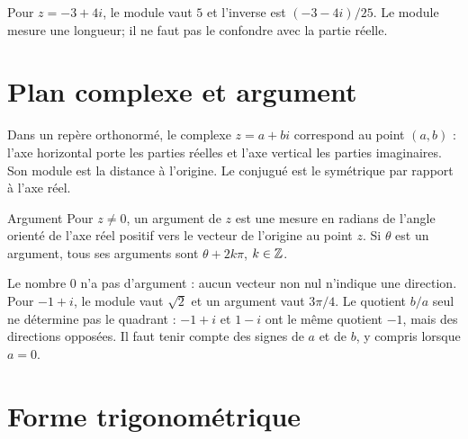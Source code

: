 Pour $z=-3+4i$, le module vaut $5$ et l'inverse est $(-3-4i)/25$. Le module mesure une longueur; il ne faut pas le confondre avec la partie réelle.

\section{Plan complexe et argument}
\label{manual:section:complexes.04}

Dans un repère orthonormé, le complexe $z=a+bi$ correspond au point $(a,b)$ : l'axe horizontal porte les parties réelles et l'axe vertical les parties imaginaires. Son module est la distance à l'origine. Le conjugué est le symétrique par rapport à l'axe réel.

\begin{center}
\end{center}

\begin{definition}{Argument}{}
Pour $z\ne0$, un argument de $z$ est une mesure en radians de l'angle orienté de l'axe réel positif vers le vecteur de l'origine au point $z$. Si $\theta$ est un argument, tous ses arguments sont $\theta+2k\pi$, $k\in\mathbb{Z}$.
\end{definition}

Le nombre $0$ n'a pas d'argument : aucun vecteur non nul n'indique une direction. Pour $-1+i$, le module vaut $\sqrt2$ et un argument vaut $3\pi/4$. Le quotient $b/a$ seul ne détermine pas le quadrant : $-1+i$ et $1-i$ ont le même quotient $-1$, mais des directions opposées. Il faut tenir compte des signes de $a$ et de $b$, y compris lorsque $a=0$.

\section{Forme trigonométrique}
\label{manual:section:complexes.05}

